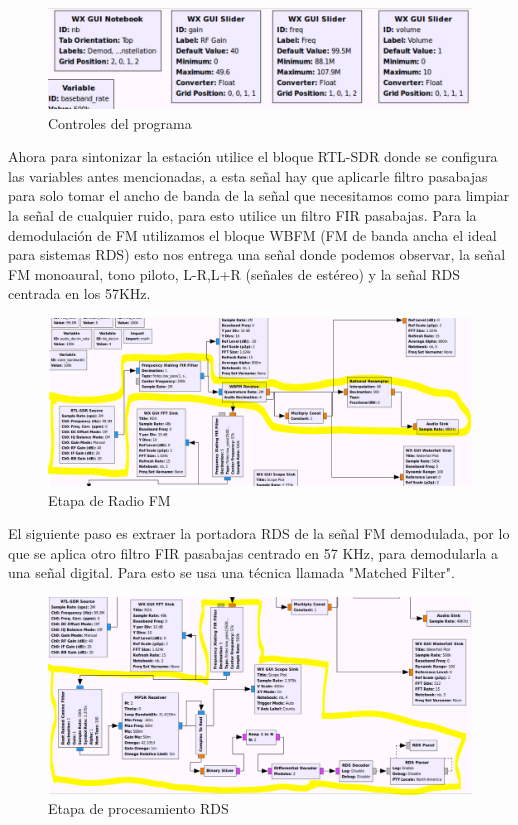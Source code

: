 \documentclass[preprint,12pt]{elsarticle}
\begin{document}
 \begin{figure}[htbp!]
\centering\includegraphics[width=0.5\linewidth]{GUIControls.PNG}
\caption{Controles del programa}
\label{controlRDS}
\end{figure}


  

Ahora para sintonizar la estación utilice el bloque RTL-SDR donde se configura las variables antes mencionadas, a esta señal hay que aplicarle filtro pasabajas para solo tomar el ancho de banda de la señal que necesitamos como para limpiar la señal de cualquier ruido, para esto utilice un filtro FIR pasabajas. Para la demodulación de FM utilizamos el bloque WBFM (FM de banda ancha el ideal para sistemas RDS) esto nos entrega una señal donde podemos observar, la señal FM monoaural, tono piloto, L-R,L+R (señales de estéreo) y la señal RDS centrada en los 57KHz.

 \begin{figure}[htbp!]
\centering\includegraphics[width=0.7\linewidth]{FMsint.PNG}
\caption{Etapa de Radio FM}
\label{FMsint}
\end{figure}



El siguiente paso es extraer la portadora RDS de la señal FM demodulada, por lo que se aplica otro filtro FIR pasabajas centrado en 57 KHz, para demodularla a una señal digital. Para esto se usa una técnica llamada "Matched Filter".

 \begin{figure}[htbp!]
\centering\includegraphics[width=0.7\linewidth]{RDSMark.PNG}
\caption{Etapa de procesamiento RDS}
\label{RDSMark}
\end{figure}
\end{document}

